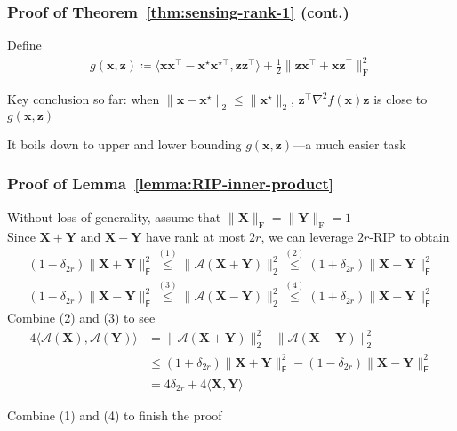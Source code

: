 \documentclass[compress,
mathserif,wide,%
]{beamer}
\begin{document}
\begin{frame}
	\frametitle{Proof of Theorem~\ref{thm:sensing-rank-1} (cont.)}
		Define
	\begin{align*}
		g(\bm{x}, \bm{z}) \coloneqq \langle \bm{x} \bm{x}^\top  - \bm{x}^{\star} \bm{x}^{\star \top}, \bm{z} \bm{z}^\top  \rangle + \frac{1}{2} \| \bm{z} \bm{x}^\top  + \bm{x} \bm{z}^{\top} \|_{\mathrm{F}}^{2}
		\end{align*}
		
		\vfill
		Key conclusion so far: when $\|\bm{x} - \bm{x}^\star \|_{2} \leq \| \bm{x}^\star \|_{2}$, $\bm{z}^\top  \nabla^2 f (\bm{x}) \bm{z}$ is close to $g(\bm{x}, \bm{z})$ 
		
		\vfill
		It boils down to upper and lower bounding $g(\bm{x}, \bm{z})$---a much easier task
\end{frame}


\begin{frame}
	\frametitle{Proof of Lemma~\ref{lemma:RIP-inner-product}}
	Without loss of generality, assume that $\| \bm{X} \|_{\mathrm{F}} = \| \bm{Y} \|_{\mathrm{F}} = 1$ \\
	
	Since $\bm{X} + \bm{Y}$ and $\bm{X} - \bm{Y}$ have rank at most $2r$, we can leverage $2r$-RIP to obtain
	\begin{align*}
	(1 - \delta_{2r}) \| \bm{X} + \bm{Y} \|_{\mathsf{F}}^{2} \stackrel{(1)}{\leq} \|\mathcal{A} (\bm{X} + \bm{Y}) \|_{2}^{2} \stackrel{(2)}{\leq} (1 + \delta_{2r}) \| \bm{X} + \bm{Y} \|_{\mathsf{F}}^{2} \\
	(1 - \delta_{2r}) \| \bm{X} - \bm{Y} \|_{\mathsf{F}}^{2} \stackrel{(3)}{\leq} \|\mathcal{A} (\bm{X} - \bm{Y}) \|_{2}^{2} \stackrel{(4)}{\leq} (1 + \delta_{2r}) \| \bm{X} - \bm{Y} \|_{\mathsf{F}}^{2} 
	\end{align*}
	Combine (2) and (3) to see
	\begin{align*}
		4  \langle \mathcal{A}(\bm{X}), \mathcal{A}(\bm{Y}) \rangle & = \|\mathcal{A} (\bm{X} + \bm{Y}) \|_{2}^{2} - \|\mathcal{A} (\bm{X} - \bm{Y}) \|_{2}^{2} \\
		& \leq (1 + \delta_{2r}) \| \bm{X} + \bm{Y} \|_{\mathsf{F}}^{2} - (1 - \delta_{2r}) \| \bm{X} - \bm{Y} \|_{\mathsf{F}}^{2} \\
		&= 4 \delta_{2r} + 4 \langle \bm{X}, \bm{Y} \rangle
	\end{align*}
	
	Combine (1) and (4) to finish the proof
\end{frame}
\end{document}
